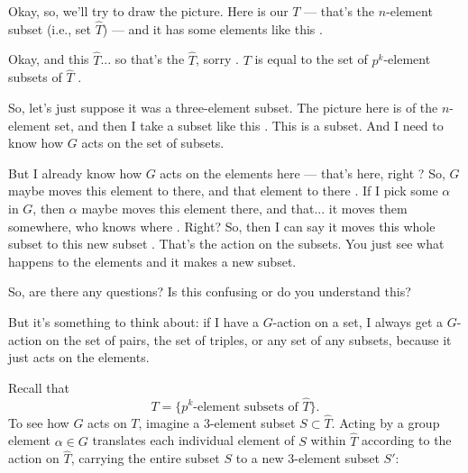 \begin{proofWrapper}
\begin{speech}[00:37:36 - 00:39:04]
Okay, so, we'll try to draw the picture. Here is our $T$ --- that's the $n$-element subset (i.e., set $\widehat{T}$) --- and it has some elements like this .

Okay, and this $\widehat{T}$... so that's the $\widehat{T}$, sorry . $T$ is equal to the set of $p^k$-element subsets of $\widehat{T}$ .

So, let's just suppose it was a three-element subset. The picture here is of the $n$-element set, and then I take a subset like this . This is a subset. And I need to know how $G$ acts on the set of subsets.

But I already know how $G$ acts on the elements here --- that's here, right ? So, $G$ maybe moves this element to there, and that element to there . If I pick some $\alpha$ in $G$, then $\alpha$ maybe moves this element there, and that... it moves them somewhere, who knows where . Right? So, then I can say it moves this whole subset to this new subset . That's the action on the subsets. You just see what happens to the elements and it makes a new subset.

So, are there any questions? Is this confusing or do you understand this? 

But it's something to think about: if I have a $G$-action on a set, I always get a $G$-action on the set of pairs, the set of triples, or any set of any subsets, because it just acts on the elements.
\end{speech}

\begin{content}
Recall that
\[
T = \{ p^k\text{-element subsets of } \widehat{T} \}.
\]
To see how $G$ acts on $T$, imagine a $3$-element subset $S \subset \widehat{T}$. Acting by a group element $\alpha \in G$ translates each individual element of $S$ within $\widehat{T}$ according to the action on $\widehat{T}$, carrying the entire subset $S$ to a new $3$-element subset $S'$:


\end{content}
\end{proofWrapper}
